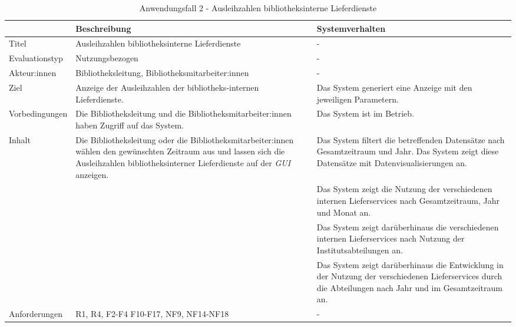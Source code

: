\begingroup
\setlength{\tabcolsep}{10pt} %
\renewcommand{\arraystretch}{1.25} 
\begin{table}[h]
    \centering
    \begin{adjustbox}{max width=\textwidth}
    \begin{tabular}{lp{7.0cm}p{7.0cm}}
       \toprule
       \textbf{}          & \textbf{Beschreibung} &\textbf{Systemverhalten}\\
       \midrule
        Titel                            &Ausleihzahlen bibliotheksinterne Lieferdienste& -\\
        Evaluationstyp                   &Nutzungsbezogen                   & -\\
        Akteur:innen                     &Bibliotheksleitung, Bibliotheksmitarbeiter:innen& -\\
        Ziel                             &Anzeige der Ausleihzahlen der bibliotheks-internen Lieferdienste.& Das System generiert eine Anzeige mit den jeweiligen Parametern.\\
        Vorbedingungen                   &Die Bibliotheksleitung und die Bibliotheksmitarbeiter:innen haben Zugriff auf das System.& Das System ist im Betrieb.\\
        Inhalt                          &Die Bibliotheksleitung oder die Bibliotheksmitarbeiter:innen wählen den gewünschten Zeitraum aus und lassen sich die Ausleihzahlen bibliotheksinterner Lieferdienste auf der \textit{\acrshort{GUI}} anzeigen. & Das System filtert die betreffenden Datensätze nach Gesamtzeitraum und Jahr. Das System zeigt diese Datensätze mit Datenvisualisierungen an.\\
                                        & &Das System zeigt die Nutzung der verschiedenen internen Lieferservices nach Gesamtzeitraum, Jahr und Monat an.\\
                                        & &Das System zeigt darüberhinaus die verschiedenen internen Lieferservices nach Nutzung der Institutsabteilungen an.\\
                                        & &Das System zeigt darüberhinaus die Entwicklung in der Nutzung der verschiedenen Lieferservices durch die Abteilungen nach Jahr und im Gesamtzeitraum an.\\
        Anforderungen                   &R1, R4, F2-F4 F10-F17, NF9, NF14-NF18& -\\
        \bottomrule
    \end{tabular}
    \end{adjustbox}
    \caption{%
    Anwendungsfall 2 - Ausleihzahlen bibliotheksinterne Lieferdienste
    }
    \label{tab:AF_Lieferdienste}
    \end{table}
\endgroup

